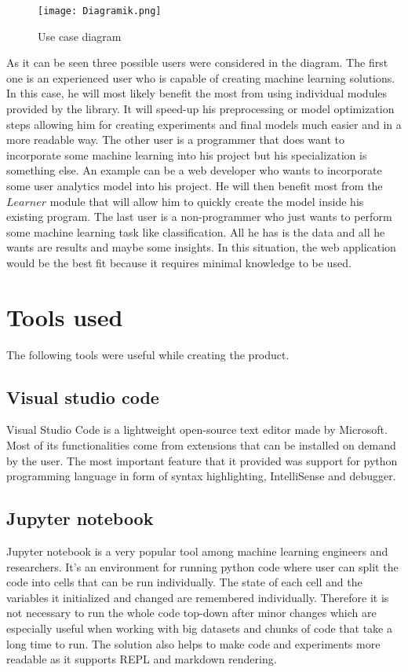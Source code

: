 \documentclass[a4paper,twoside,12pt]{book}
\begin{document}
\begin{figure}[!htb]
    \centering
    \texttt{[image: Diagramik.png]}
    \caption{Use case diagram}
    \label{fig:use_case}
\end{figure}

As it can be seen three possible users were considered in the diagram. The first one is an experienced user who is capable of creating machine learning solutions. In this case, he will most likely benefit the most from using individual modules provided by the library. It will speed-up his preprocessing or model optimization steps allowing him for creating experiments and final models much easier and in a more readable way.
The other user is a programmer that does want to incorporate some machine learning into his project but his specialization is something else. An example can be a web developer who wants to incorporate some user analytics model into his project. He will then benefit most from the $Learner$ module that will allow him to quickly create the model inside his existing program.
The last user is a non-programmer who just wants to perform some machine learning task like classification. All he has is the data and all he wants are results and maybe some insights. In this situation, the web application would be the best fit because it requires minimal knowledge to be used.

\section{Tools used}

The following tools were useful while creating the product. 

\subsection{Visual studio code}

{V}isual {S}tudio {C}ode \cite{bib:VSC} is a lightweight open-source text editor made by Microsoft. Most of its functionalities come from extensions that can be installed on demand by the user. The most important feature that it provided was support for python programming language in form of syntax highlighting, IntelliSense and debugger.


\subsection{Jupyter notebook}

Jupyter \cite{bib:Jupyter} notebook is a very popular tool among machine learning engineers and researchers. It's an environment for running python code where user can split the code into cells that can be run individually. The state of each cell and the variables it initialized and changed are remembered individually. Therefore it is not necessary to run the whole code top-down after minor changes which are especially useful when working with big datasets and chunks of code that take a long time to run.
The solution also helps to make code and experiments more readable as it supports REPL and markdown rendering.
\end{document}
